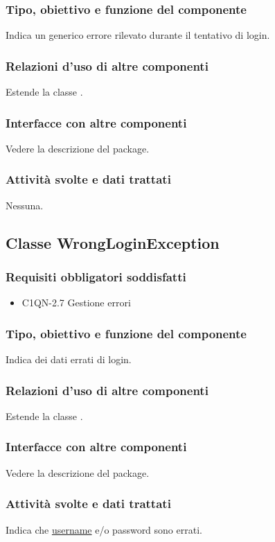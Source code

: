 \subsubsection*{Tipo, obiettivo e funzione del componente}
Indica un generico errore rilevato durante il tentativo di login.
\subsubsection*{Relazioni d'uso di altre componenti}
Estende la classe .
\subsubsection*{Interfacce con altre componenti}
Vedere la descrizione del package.
\subsubsection*{Attivit\`a svolte e dati trattati}
Nessuna.

\subsection{Classe WrongLoginException}
\subsubsection*{Requisiti obbligatori soddisfatti}
\begin{itemize}
	\item C1QN-2.7 Gestione errori
\end{itemize}
\subsubsection*{Tipo, obiettivo e funzione del componente}
Indica dei dati errati di login.
\subsubsection*{Relazioni d'uso di altre componenti}
Estende la classe .
\subsubsection*{Interfacce con altre componenti}
Vedere la descrizione del package.
\subsubsection*{Attivit\`a svolte e dati trattati}
Indica che \underline{username} e/o password sono errati.

